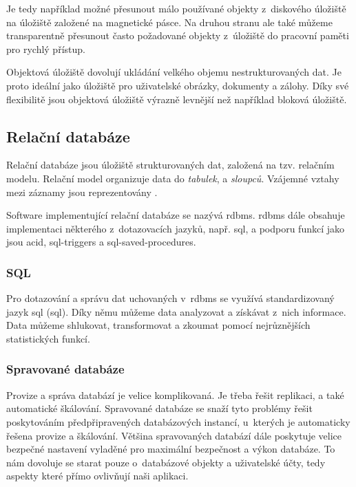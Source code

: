 Je tedy například možné přesunout málo používané objekty z~diskového úložiště na úložiště založené na magnetické pásce. Na druhou stranu ale také můžeme transparentně přesunout často požadované objekty z~úložiště do pracovní paměti pro rychlý přístup.

Objektová úložiště dovolují ukládání velkého objemu nestrukturovaných dat. Je proto ideální jako úložiště pro uživatelské obrázky, dokumenty a zálohy. Díky své flexibilitě jsou objektová úložiště výrazně levnější než například bloková úložiště.

\subsection{Relační databáze}

Relační databáze\cite{relational-database} jsou úložiště strukturovaných dat, založená na tzv. relačním modelu. Relační model organizuje data do \emph{tabulek},  a \emph{sloupců}. Vzájemné vztahy mezi záznamy jsou reprezentovány . 

Software implementující relační databáze se nazývá \acrfull{rdbms}. \acrshort{rdbms} dále obsahuje implementaci některého z~dotazovacích jazyků, např. \acrshort{sql}, a podporu funkcí jako jsou \acrshort{acid}, \glspl{sql-trigger} a \glspl{sql-saved-procedure}.

\subsubsection{SQL}

Pro dotazování a správu dat uchovaných v~\acrshort{rdbms} se využívá standardizovaný jazyk \acrshort{sql} (\acrlong{sql})\cite{sql}. Díky němu můžeme data analyzovat a získávat z~nich informace. Data můžeme shlukovat, transformovat a zkoumat pomocí nejrůznějších statistických funkcí.

\subsubsection{Spravované databáze}
\label{subsub:managed-databases}

Provize a správa databází je velice komplikovaná. Je třeba řešit replikaci, a také automatické škálování. Spravované databáze\cite{managed-databases} se snaží tyto problémy řešit poskytováním předpřipravených databázových instancí, u~kterých je automaticky řešena provize a škálování. Většina spravovaných databází dále poskytuje velice bezpečné nastavení vyladěné pro maximální bezpečnost a výkon databáze. To nám dovoluje se starat pouze o~databázové objekty a uživatelské účty, tedy aspekty které přímo ovlivňují naši aplikaci.

